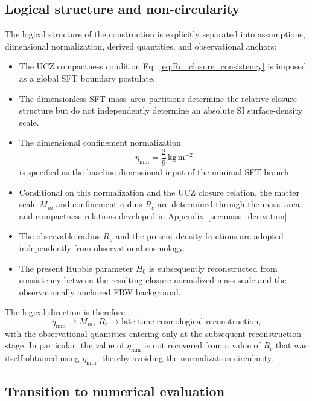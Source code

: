 \documentclass[12pt]{article}
\begin{document}
\subsection{Logical structure and non-circularity}

The logical structure of the construction is explicitly separated into
assumptions, dimensional normalization, derived quantities, and
observational anchors:

\begin{itemize}

\item The UCZ compactness condition
Eq.~\eqref{eq:Rc_closure_consistency} is imposed as a global SFT boundary
postulate.

\item The dimensionless SFT mass--area partitions determine the
relative closure structure but do not independently determine an
absolute SI surface-density scale.

\item The dimensional confinement normalization
\[
\eta_{\min}
=
\frac{2}{9}\,\mathrm{kg\,m^{-2}}
\]
is specified as the baseline dimensional input of the minimal SFT
branch.

\item Conditional on this normalization and the UCZ closure relation,
the matter scale $M_m$ and confinement radius $R_c$ are determined
through the mass--area and compactness relations developed in
Appendix~\ref{sec:mass_derivation}.

\item The observable radius $R_o$ and the present density fractions are
adopted independently from observational cosmology.

\item The present Hubble parameter $H_0$ is subsequently reconstructed
from consistency between the resulting closure-normalized mass scale
and the observationally anchored FRW background.

\end{itemize}

The logical direction is therefore
\[
\eta_{\min}
\longrightarrow
M_m,\ R_c
\longrightarrow
\text{late-time cosmological reconstruction},
\]
with the observational quantities entering only at the subsequent
reconstruction stage. In particular, the value of $\eta_{\min}$ is not
recovered from a value of $R_c$ that was itself obtained using
$\eta_{\min}$, thereby avoiding the normalization circularity.

\subsection{Transition to numerical evaluation}
\end{document}
